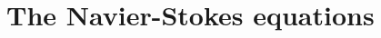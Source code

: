 \documentclass[11pt,a4paper]{memoir}
\begin{document}
\chapter{The Navier-Stokes equations}
\end{document}
